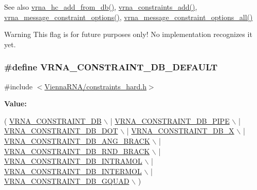 \begin{DoxySeeAlso}{See also}
\hyperlink{group__hard__constraints_ga5b4de3247b67358080c176b94591a8e6}{vrna\+\_\+hc\+\_\+add\+\_\+from\+\_\+db()}, \hyperlink{group__constraints_ga35a401f680969a556858a8dd5f1d07cc}{vrna\+\_\+constraints\+\_\+add()}, \hyperlink{group__constraints_gaa1f20b53bf09ac2e6b0dbb13f7d89670}{vrna\+\_\+message\+\_\+constraint\+\_\+options()}, \hyperlink{group__constraints_gaec7e13fa0465c2acc7a621d1aecb709f}{vrna\+\_\+message\+\_\+constraint\+\_\+options\+\_\+all()}
\end{DoxySeeAlso}
\begin{DoxyWarning}{Warning}
This flag is for future purposes only! No implementation recognizes it yet. 
\end{DoxyWarning}
\subsubsection[{\texorpdfstring{V\+R\+N\+A\+\_\+\+C\+O\+N\+S\+T\+R\+A\+I\+N\+T\+\_\+\+D\+B\+\_\+\+D\+E\+F\+A\+U\+LT}{VRNA_CONSTRAINT_DB_DEFAULT}}]{\setlength{\rightskip}{0pt plus 5cm}\#define V\+R\+N\+A\+\_\+\+C\+O\+N\+S\+T\+R\+A\+I\+N\+T\+\_\+\+D\+B\+\_\+\+D\+E\+F\+A\+U\+LT}\hypertarget{group__hard__constraints_ga1c3864bdc92147a4d93de2b1b4356177}{}\label{group__hard__constraints_ga1c3864bdc92147a4d93de2b1b4356177}


{\ttfamily \#include $<$\hyperlink{constraints__hard_8h}{Vienna\+R\+N\+A/constraints\+\_\+hard.\+h}$>$}

{\bfseries Value\+:}
\begin{DoxyCode}
(   \hyperlink{group__hard__constraints_ga4bfc2f15c4f261c62a11af9d2aa80c90}{VRNA\_CONSTRAINT\_DB} \(\backslash\)
      | \hyperlink{group__hard__constraints_ga13053547a2de5532b64b64d35e097ae1}{VRNA\_CONSTRAINT\_DB\_PIPE} \(\backslash\)
      | \hyperlink{group__hard__constraints_ga369bea82eae75fbe626f409fa425747e}{VRNA\_CONSTRAINT\_DB\_DOT} \(\backslash\)
      | \hyperlink{group__hard__constraints_ga7283bbe0f8954f7b030ecc3f2d1932b2}{VRNA\_CONSTRAINT\_DB\_X} \(\backslash\)
      | \hyperlink{constraints__hard_8h_ad54c1315a47d55653dcaa5de6e544b77}{VRNA\_CONSTRAINT\_DB\_ANG\_BRACK} \(\backslash\)
      | \hyperlink{group__hard__constraints_gac17b034852c914bc5879954c65d7e74b}{VRNA\_CONSTRAINT\_DB\_RND\_BRACK} \(\backslash\)
      | \hyperlink{group__hard__constraints_ga5c17253f5a39d1d49b0fb11f5196982a}{VRNA\_CONSTRAINT\_DB\_INTRAMOL} \(\backslash\)
      | \hyperlink{group__hard__constraints_ga31d0ebb9755ca8a4acafc14f00ca755d}{VRNA\_CONSTRAINT\_DB\_INTERMOL} \(\backslash\)
      | \hyperlink{group__hard__constraints_ga75cfab03cdc97c95b3ce8bb29f52b08e}{VRNA\_CONSTRAINT\_DB\_GQUAD} \(\backslash\)
    )
\end{DoxyCode}


